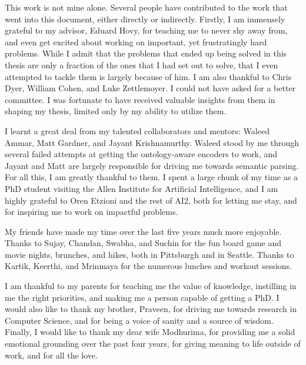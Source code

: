 This work is not mine alone. Several people have contributed to the work that
went into this document, either directly or indirectly.
Firstly, I am immensely grateful to my advisor, Eduard Hovy, for teaching me
to never shy away from, and even get excited about working on important, yet frustratingly hard problems. While I admit that the problems that ended up being solved
in this thesis are only a fraction of the ones that I had set out to solve, that I even
attempted to tackle them is largely because of him. I am also thankful to Chris Dyer,
William Cohen, and Luke Zettlemoyer. I could not have asked for a better committee. I was fortunate to have received valuable insights from them in shaping my
thesis, limited only by my ability to utilize them.

I learnt a great deal from my talented collaborators and mentors: Waleed Ammar,
Matt Gardner, and Jayant Krishnamurthy. Waleed stood by me through several failed
attempts at getting the ontology-aware encoders to work, and Jayant and Matt are
largely responsible for driving me towards semantic parsing. For all this, I am greatly
thankful to them. I spent a large chunk of my time as a PhD student visiting the Allen
Institute for Artificial Intelligence, and I am highly grateful to Oren Etzioni and the
rest of AI2, both for letting me stay, and for inspiring me to work on impactful
problems.

My friends have made my time over the last five years much more enjoyable.
Thanks to Sujay, Chandan, Swabha, and Suchin for the fun board game and movie
nights, brunches, and hikes, both in Pittsburgh and in Seattle. Thanks to Kartik,
Keerthi, and Mrinmaya for the numerous lunches and workout sessions.

I am thankful to my parents for teaching me the value of knowledge, instilling
in me the right priorities, and making me a person capable of getting a PhD. I would
also like to thank my brother, Praveen, for driving me towards research in Computer
Science, and for being a voice of sanity and a source of wisdom. Finally, I would
like to thank my dear wife Modhurima, for providing me a solid emotional grounding
over the past four years, for giving meaning to life outside of work, and for all the
love.
